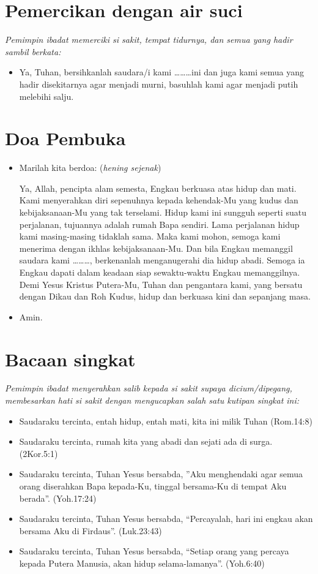 \documentclass[10pt,a5paper,fancyhdr]{memoir}
\newcommand{\BU}[1]{\begin{itemize}\itemsep0pt \item[U:] #1 \end{itemize}}
\newcommand{\BP}[1]{\begin{itemize}\itemsep0pt \item[P:] #1 \end{itemize}}
\newcommand{\nama}{\ldots\ldots\ldots}
\begin{document}
\section*{Pemercikan dengan air suci} 

\textit{
Pemimpin ibadat memerciki si sakit, tempat tidurnya, dan semua 
yang hadir sambil berkata:} 

\BP{Ya, Tuhan, bersihkanlah saudara/i kami \nama ini dan juga kami 
semua yang hadir disekitarnya agar menjadi murni, basuhlah kami 
agar menjadi putih melebihi salju.}

\section*{Doa Pembuka}

\BP{Marilah kita berdoa: (\textit{hening sejenak})

Ya, Allah, pencipta alam 
semesta, Engkau berkuasa atas hidup dan mati. Kami menyerahkan 
diri sepenuhnya kepada kehendak-Mu yang kudus dan 
kebijaksanaan-Mu yang tak terselami. Hidup kami ini sungguh 
seperti suatu perjalanan, tujuannya adalah rumah Bapa sendiri. Lama 
perjalanan hidup kami masing-masing tidaklah sama. Maka kami 
mohon, semoga kami menerima dengan ikhlas kebijaksanaan-Mu. 
Dan bila Engkau memanggil saudara kami \nama, 
berkenanlah menganugerahi dia hidup abadi. Semoga ia Engkau 
dapati dalam keadaan siap sewaktu-waktu Engkau memanggilnya. 
Demi Yesus Kristus Putera-Mu, Tuhan dan pengantara kami, yang 
bersatu dengan Dikau dan Roh Kudus, hidup dan berkuasa kini dan 
sepanjang masa.} 

\BU{Amin.}
 
\section*{Bacaan singkat} 


\textit{Pemimpin ibadat menyerahkan salib kepada si sakit supaya 
dicium/dipegang, membesarkan hati si sakit dengan mengucapkan 
salah satu kutipan singkat ini: 
}
\begin{itemize}
\item Saudaraku tercinta, entah hidup, entah mati, kita ini milik Tuhan 
(Rom.14:8) 
\item Saudaraku tercinta, rumah kita yang abadi dan sejati ada di surga. 
(2Kor.5:1) 
\item Saudaraku tercinta, Tuhan Yesus bersabda, ”Aku menghendaki 
agar semua orang diserahkan Bapa kepada-Ku, tinggal bersama-Ku 
di tempat Aku berada”. (Yoh.17:24) 
\item Saudaraku tercinta, Tuhan Yesus bersabda, “Percayalah, hari ini 
engkau akan bersama Aku di Firdaus”. (Luk.23:43) 
\item Saudaraku tercinta, Tuhan Yesus bersabda, “Setiap orang yang 
percaya kepada Putera Manusia, akan hidup selama-lamanya”. 
(Yoh.6:40)
\end{itemize}
 
\end{document}

